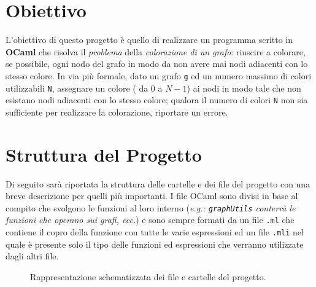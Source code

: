 \section{Obiettivo}
L'obiettivo di questo progetto è quello di realizzare un programma scritto in \textbf{OCaml} che risolva il \textit{problema} della \textit{colorazione di un grafo}: riuscire a colorare, se possibile, ogni nodo del grafo in modo da non avere mai nodi adiacenti con lo stesso colore. In via più formale, dato un grafo \lstinline[style=cmd]|g| ed un numero massimo di colori utilizzabili \lstinline[style=cmd]|N|, assegnare un colore ( da $0$ a $N-1$) ai nodi in modo tale che non esistano nodi adiacenti con lo stesso colore; qualora il numero di colori \lstinline[style=cmd]|N| non sia sufficiente per realizzare la colorazione, riportare un errore.
 
\section{Struttura del Progetto}
Di seguito sarà riportata la struttura delle cartelle e dei file del progetto con una breve descrizione per quelli più importanti. I file OCaml sono divisi in base al compito che svolgono le funzioni al loro interno (\textit{e.g.: \lstinline[style=cmd]|graphUtils| conterrà le funzioni che operano sui grafi, ecc.}) e sono sempre formati da un file \lstinline[style=cmd]|.ml| che contiene il copro della funzione con tutte le varie espressioni ed un file \lstinline[style=cmd]|.mli| nel quale è presente solo il tipo delle funzioni ed espressioni che verranno utilizzate dagli altri file. %

\begin{figure}[H]
	\caption{Rappresentazione schematizzata dei file e cartelle del progetto.}
\end{figure}

